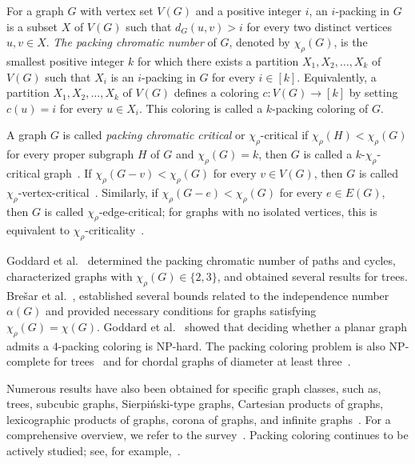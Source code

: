 \documentclass[12pt]{article}
\begin{document}
For a graph $G$ with vertex set $V(G)$ and a positive integer $i$, an $i$-packing in $G$ is a subset $X$ of $V(G)$ such that $d_G(u,v)>i$ for every two distinct vertices $u,v \in X$.
\textit{The packing chromatic number} of $G$, denoted by $\chi_{\rho}(G)$, is the smallest positive integer $k$ for which there exists a partition $X_1, X_2, \ldots, X_k$ of $V(G)$ such that $X_i$ is an $i$-packing in $G$ for every $i \in [k]$.
Equivalently, a partition $X_1, X_2, \ldots, X_k$ of $V(G)$ defines a coloring $c : V(G) \to [k]$ by setting $c(u)=i$ for every  $u \in X_i$. This coloring is called a $k$-packing coloring of $G$.

A graph $G$ is called \textit{packing chromatic critical} or $\chi_\rho$-critical if $\chi_\rho(H) < \chi_\rho(G)$ for every proper subgraph $H$ of $G$ and $\chi_\rho(G) = k$, then $G$ is called a $k$-$\chi_\rho$-critical graph~\cite{bresar-2022}.
If $\chi_\rho(G - v) < \chi_\rho(G)$ for every $v \in V(G)$, then $G$ is called $\chi_\rho$-vertex-critical~\cite{klavzar-2019}. Similarly, if $\chi_\rho(G - e) < \chi_\rho(G)$ for every $e \in E(G)$, then $G$ is called $\chi_\rho$-edge-critical; for graphs with no isolated vertices, this is equivalent to $\chi_\rho$-criticality~\cite{bresar-2022}.


Goddard et al.~\cite{goddard-2008} determined the packing chromatic number of paths and cycles, characterized graphs with $\chi_{\rho}(G) \in \{2,3\}$, and obtained several results for trees.
Bre\v{s}ar et al.~\cite{bresar-2018}, established several bounds related to the independence number $\alpha(G)$ and provided necessary conditions for graphs satisfying $\chi_{\rho}(G)=\chi(G)$.
Goddard et al.~\cite{goddard-2008} showed that deciding whether a planar graph admits a $4$-packing coloring is NP-hard. The packing coloring problem is also NP-complete for trees~\cite{fiala-2010} and for chordal graphs of diameter at least three~\cite{kim-2018}.

Numerous results have also been obtained for specific graph classes, such as, trees, subcubic graphs, Sierpi\'nski-type graphs, Cartesian products of graphs,   lexicographic products of graphs, corona of graphs, and infinite graphs~\cite{goddard-2008, rall-2008, bresar-2007, balogh-2018, bresar-ferme-2018-1, gastineau-2019, bresar-gastineau-2020, deng-2021, bresar-ferme-2018, korze-2019, bozovic-2021, laiche-2017, fiala-2009, togni-2014, ekstein-2014, martin-2017}. For a comprehensive overview, we refer to the survey~\cite{bresar-survey-2020}. Packing coloring continues to be actively studied; see, for example,~\cite{furmanczyk-2025,gregor-2024}.
\end{document}
